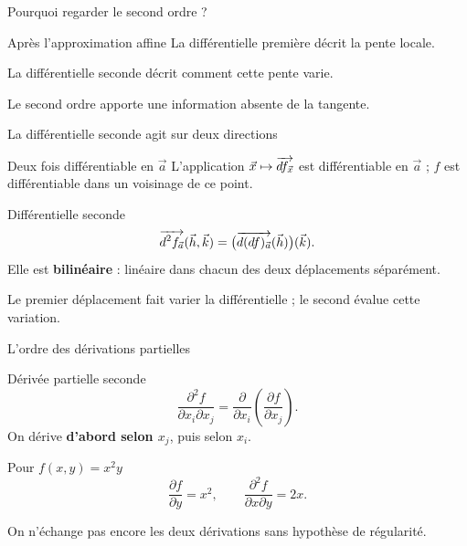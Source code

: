 \begin{frame}[t]{Pourquoi regarder le second ordre ?}
\coursanalyse
\begin{cours}{Après l’approximation affine}
La différentielle première décrit la pente locale.

\medskip
La différentielle seconde décrit comment cette pente varie.
\end{cours}
\begin{center}\end{center}
\vfill Le second ordre apporte une information absente de la tangente.
\end{frame}

\begin{frame}[t]{La différentielle seconde agit sur deux directions}
\coursanalyse
\begin{notion}{Deux fois différentiable en $\vec a$}
L'application $\vec x\mapsto\overrightarrow{df_{\vec x}}$ est différentiable en $\vec a$ ; $f$ est différentiable dans un voisinage de ce point.
\end{notion}
\begin{notion}{Différentielle seconde}
\[\overrightarrow{d^2f_{\vec a}}(\vec h,\vec k)
=\bigl(\overrightarrow{d(df)_{\vec a}}(\vec h)\bigr)(\vec k).\]
Elle est \textbf{bilinéaire} : linéaire dans chacun des deux déplacements séparément.
\end{notion}
\vfill Le premier déplacement fait varier la différentielle ; le second évalue cette variation.
\end{frame}

\begin{frame}[t]{L’ordre des dérivations partielles}
\coursanalyse
\begin{notion}{Dérivée partielle seconde}
\[\frac{\partial^2 f}{\partial x_i\partial x_j}
=\frac{\partial}{\partial x_i}\left(\frac{\partial f}{\partial x_j}\right).\]
On dérive \textbf{d'abord selon $x_j$}, puis selon $x_i$.
\end{notion}
\begin{exemple}{Pour $f(x,y)=x^2y$}
\[\frac{\partial f}{\partial y}=x^2,\qquad
\frac{\partial^2f}{\partial x\partial y}=2x.\]
\end{exemple}
\vfill On n'échange pas encore les deux dérivations sans hypothèse de régularité.
\end{frame}

